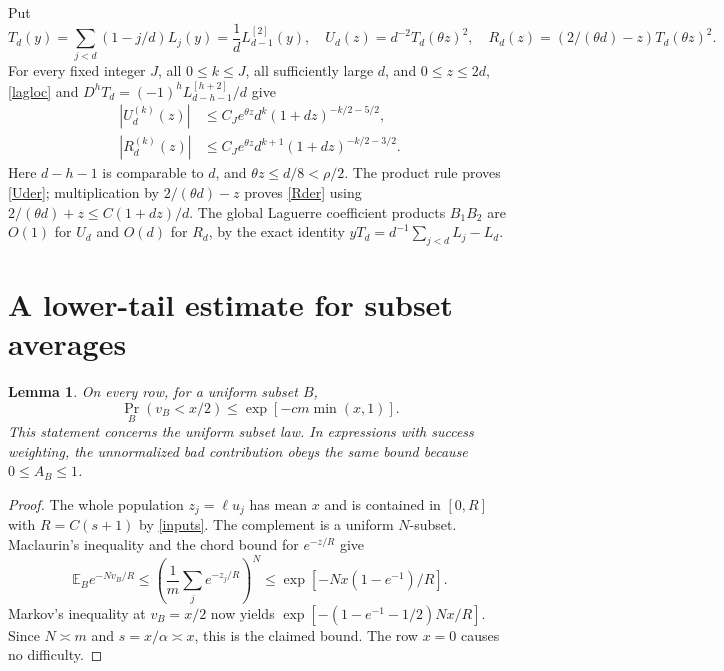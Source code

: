 \documentclass[11pt]{article}
\newtheorem{lemma}{Lemma}
\newcommand{\E}{\mathbb E}
\begin{document}
Put
\[
 T_d(y)=\sum_{j<d}(1-j/d)L_j(y)=\frac1dL_{d-1}^{[2]}(y),
 \quad U_d(z)=d^{-2}T_d(\theta z)^2,
 \quad R_d(z)=(2/(\theta d)-z)T_d(\theta z)^2.
\]
For every fixed integer $J$, all $0\le k\le J$, all sufficiently
large $d$, and $0\le z\le2d$, \eqref{lagloc} and
$D^hT_d=(-1)^hL_{d-h-1}^{[h+2]}/d$ give
\begin{align}
 |U_d^{(k)}(z)|&\le C_J e^{\theta z}d^k
                      (1+dz)^{-k/2-5/2},\label{Uder}\\
 |R_d^{(k)}(z)|&\le C_J e^{\theta z}d^{k+1}
                      (1+dz)^{-k/2-3/2}.\label{Rder}
\end{align}
Here $d-h-1$ is comparable to $d$, and $\theta z\le d/8<\rho/2$.
The product rule proves \eqref{Uder}; multiplication by
$2/(\theta d)-z$ proves \eqref{Rder} using
$2/(\theta d)+z\le C(1+dz)/d$.
The global Laguerre coefficient products $B_1B_2$ are $O(1)$ for
$U_d$ and $O(d)$ for $R_d$, by the exact identity
$yT_d=d^{-1}\sum_{j<d}L_j-L_d$.

\section*{A lower-tail estimate for subset averages}
\begin{lemma}\label{tail}
On every row, for a uniform subset $B$,
\[
 \Pr_B(v_B<x/2)\le\exp[-c m\min(x,1)].
\]
This statement concerns the uniform subset law. In expressions with
success weighting, the unnormalized bad contribution obeys the same
bound because $0\le A_B\le1$.
\end{lemma}
\begin{proof}
The whole population $z_j=\ell u_j$ has mean $x$ and is contained in
$[0,R]$ with $R=C(s+1)$ by \eqref{inputs}. The complement is a uniform
$N$-subset. Maclaurin's inequality and the chord bound for $e^{-z/R}$
give
\[
 \E_B e^{-Nv_B/R}
 \le\left(\frac1m\sum_j e^{-z_j/R}\right)^N
 \le\exp[-Nx(1-e^{-1})/R].
\]
Markov's inequality at $v_B=x/2$ now yields
$\exp[-(1-e^{-1}-1/2)Nx/R]$.
Since $N\asymp m$ and $s=x/\alpha\asymp x$, this is the claimed bound.
The row $x=0$ causes no difficulty.
\end{proof}
\end{document}
